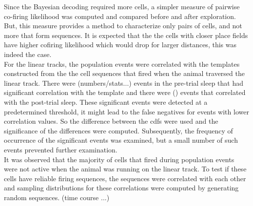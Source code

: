 Since the Bayesian decoding required more cells, a simpler measure of pairwise co-firing likelihood was computed and compared before and after exploration. But, this measure provides a method to characterize only pairs of cells, and not more that form sequences. It is expected that the the cells with closer place fields have higher cofiring likelihood which would drop for larger distances, this was indeed the case.\\ 

For the linear tracks, the population events were correlated with the templates constructed from the the cell sequences that fired when the animal traversed the linear track. There were (numbers/stats...) events in the pre-trial sleep that had significant correlation with the template and there were () events that correlated with the post-trial sleep. These significant events were detected at a predetermined threshold, it might lead to the false negatives for events with lower correlation values. So the difference between the cdfs were used and the significance of the differences were computed. Subsequently, the frequency of occurrence of the significant events was examined, but a small number of such events prevented further examination.\\
It was observed that the majority of cells that fired during population events were not active when the animal was running on the linear track. To test if these cells have reliable firing sequences, the sequences were correlated with each other and sampling distributions for these correlations were computed by generating random sequences. (time course ...)
